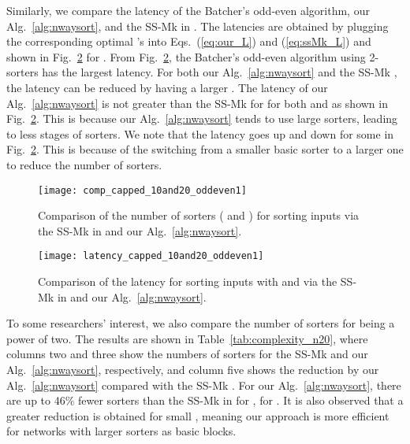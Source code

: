 \documentclass[10pt,journal,cspaper,compsoc]{IEEEtran}
\begin{document}
Similarly, we compare the latency of the Batcher's odd-even algorithm, our Alg.~\ref{alg:nwaysort}, and the SS-Mk in \cite{gao1997sloping}. The latencies are obtained by plugging the corresponding optimal 's into Eqs.~(\ref{eq:our_L}) and (\ref{eq:ssMk_L}) and shown in Fig.~\ref{fig:latency_n1020} for .
From Fig.~\ref{fig:latency_n1020}, the Batcher's odd-even algorithm using 2-sorters has the largest latency. For both our Alg.~\ref{alg:nwaysort} and the SS-Mk \cite{gao1997sloping}, the latency can be reduced by having a larger .
The latency of our Alg.~\ref{alg:nwaysort} is not greater than the SS-Mk for  for both  and  as shown in Fig.~\ref{fig:latency_n1020}. This is because our Alg.~\ref{alg:nwaysort} tends to use large sorters, leading to less stages of sorters. We note that the latency goes up and down for some  in Fig.~\ref{fig:latency_n1020}. This is because of the switching from a smaller basic sorter to a larger one to reduce the number of sorters.


\begin{figure}[!h]
\centering
\texttt{[image: comp\_capped\_10and20\_oddeven1]}
\caption{Comparison of the number of sorters ( and ) for sorting  inputs via the SS-Mk in \cite{gao1997sloping} and our Alg.~\ref{alg:nwaysort}.}
\label{fig:complexity_n1020}
\end{figure}

\begin{figure}[!h]
\centering
\texttt{[image: latency\_capped\_10and20\_oddeven1]}
\caption{Comparison of the latency for sorting  inputs with  and  via the SS-Mk in \cite{gao1997sloping} and our Alg.~\ref{alg:nwaysort}.}
\label{fig:latency_n1020}
\end{figure}


To some researchers' interest, we also compare the number of sorters for  being a power of two. The results are shown in Table~\ref{tab:complexity_n20}, where columns two and three show the numbers of sorters for the SS-Mk and our Alg.~\ref{alg:nwaysort}, respectively, and column five shows the reduction by our Alg.~\ref{alg:nwaysort} compared with the SS-Mk \cite{gao1997sloping}. For our Alg.~\ref{alg:nwaysort}, there are up to 46\% fewer sorters than the SS-Mk in \cite{gao1997sloping} for , for .
It is also observed that a greater reduction is obtained for small , meaning our approach is more efficient for networks with larger sorters as basic blocks.
\end{document}
